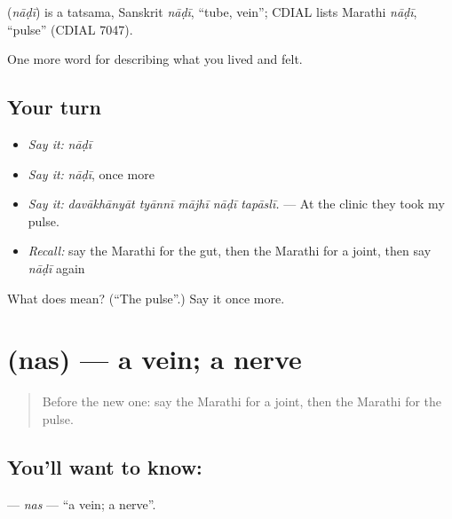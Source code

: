 \begin{cousinweb}
\textbf{} (\emph{nāḍī}) is a tatsama, Sanskrit \emph{nāḍī}, \textquotedblleft{}tube, vein\textquotedblright{}; CDIAL lists Marathi \emph{nāḍī}, \textquotedblleft{}pulse\textquotedblright{} (CDIAL 7047).
\end{cousinweb}

\begin{grammarlens}[title={What you've built}]
One more word for describing what you lived and felt.
\end{grammarlens}

\subsection*{Your turn}
\begin{itemize}
\raggedright
  \item \emph{Say it:} \emph{nāḍī}
  \item \emph{Say it:} \emph{nāḍī}, once more
  \item \emph{Say it:} \emph{davākhānyāt tyānnī mājhī nāḍī tapāslī.} — At the clinic they took my pulse.
  \item \emph{Recall:} say the Marathi for the gut, then the Marathi for a joint, then say \emph{nāḍī} again
\end{itemize}

\begin{tcolorbox}[breakable,colback=teal!4,colframe=teal!35!black,title={Before you move on}]
What does  mean? (\textquotedblleft{}The pulse\textquotedblright{}.) Say it once more.
\end{tcolorbox}
\section[\texorpdfstring{\mr{नस} (nas)}{नस (nas)}]{ (nas) — a vein; a nerve}

\label{lesson:MR-C479-nas}



\begin{quote}
Before the new one: say the Marathi for a joint, then the Marathi for the pulse.
\end{quote}

\subsection*{You'll want to know: }
\textbf{} — \emph{nas} — \textquotedblleft{}a vein; a nerve\textquotedblright{}.

